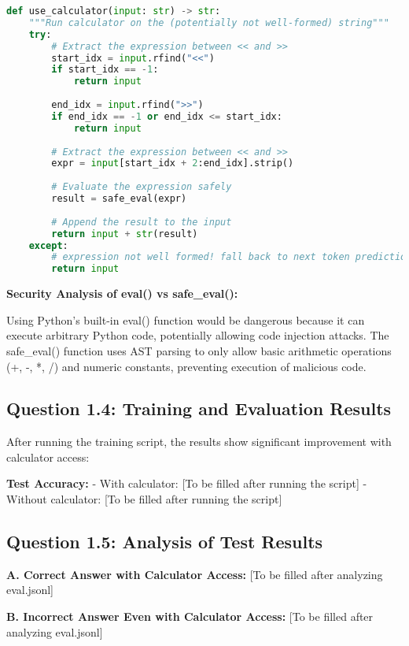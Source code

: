 \documentclass[11pt]{article}
\begin{document}
\begin{lstlisting}[language=Python]
def use_calculator(input: str) -> str:
    """Run calculator on the (potentially not well-formed) string"""
    try:
        # Extract the expression between << and >>
        start_idx = input.rfind("<<")
        if start_idx == -1:
            return input
        
        end_idx = input.rfind(">>")
        if end_idx == -1 or end_idx <= start_idx:
            return input
            
        # Extract the expression between << and >>
        expr = input[start_idx + 2:end_idx].strip()
        
        # Evaluate the expression safely
        result = safe_eval(expr)
        
        # Append the result to the input
        return input + str(result)
    except:
        # expression not well formed! fall back to next token prediction
        return input
\end{lstlisting}

\textbf{Security Analysis of eval() vs safe\_eval():}

Using Python's built-in eval() function would be dangerous because it can execute arbitrary Python code, potentially allowing code injection attacks. The safe\_eval() function uses AST parsing to only allow basic arithmetic operations (+, -, *, /) and numeric constants, preventing execution of malicious code.

\subsection{Question 1.4: Training and Evaluation Results}

After running the training script, the results show significant improvement with calculator access:

\textbf{Test Accuracy:}
- With calculator: [To be filled after running the script]
- Without calculator: [To be filled after running the script]

\subsection{Question 1.5: Analysis of Test Results}

\textbf{A. Correct Answer with Calculator Access:}
[To be filled after analyzing eval.jsonl]

\textbf{B. Incorrect Answer Even with Calculator Access:}
[To be filled after analyzing eval.jsonl]
\end{document}
